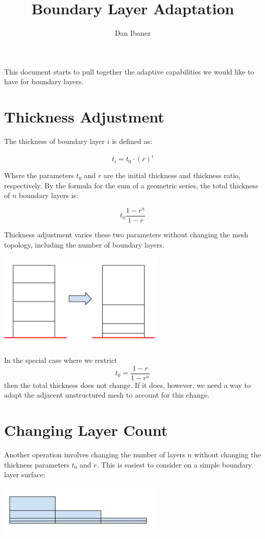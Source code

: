 \documentclass{article}
\title{Boundary Layer Adaptation}
\author{Dan Ibanez}
\begin{document}
\maketitle

This document starts to pull together the adaptive
capabilities we would like to have for boundary
layers.

\section{Thickness Adjustment}

The thickness of boundary layer $i$ is defined as:

\[t_i = t_0\cdot (r)^i\]

Where the parameters $t_0$ and $r$ are the initial
thickness and thickness ratio, respectively.
By the formula for the sum of a geometric series,
the total thickness of $n$ boundary layers is:

\[t_0\frac{1-r^n}{1-r}\]

Thickness adjustment varies these two parameters without
changing the mesh topology, including the number of boundary
layers.

\includegraphics[width=0.6\textwidth]{thick_adapt.png}

In the special case where we restrict
\[t_0 = \frac{1-r}{1-r^n}\]
then the total thickness does not change.
If it does, however, we need a way to adapt the adjacent
unstructured mesh to account for this change.

\section{Changing Layer Count}

Another operation involves changing the number of layers $n$
without changing the thickness parameters $t_0$ and $r$.
This is easiest to consider on a simple boundary layer surface:

\includegraphics[width=0.6\textwidth]{layer_step.png}
\end{document}
